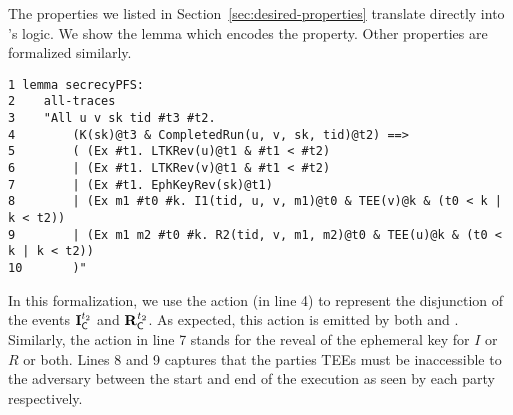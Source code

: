 %

The properties we listed in Section~\ref{sec:desired-properties}
translate directly into \mTamarin's logic.
%
We show the \mTamarin{} lemma which encodes the \mPredPfs{} property.
%
Other properties are formalized similarly.
%

\begin{small}
\begin{verbatim}
1 lemma secrecyPFS:
2    all-traces
3    "All u v sk tid #t3 #t2.
4        (K(sk)@t3 & CompletedRun(u, v, sk, tid)@t2) ==>
5        ( (Ex #t1. LTKRev(u)@t1 & #t1 < #t2)
6        | (Ex #t1. LTKRev(v)@t1 & #t1 < #t2)
7        | (Ex #t1. EphKeyRev(sk)@t1)
8        | (Ex m1 #t0 #k. I1(tid, u, v, m1)@t0 & TEE(v)@k & (t0 < k | k < t2))
9        | (Ex m1 m2 #t0 #k. R2(tid, v, m1, m2)@t0 & TEE(u)@k & (t0 < k | k < t2))
10       )"
\end{verbatim}
\end{small}
%

In this formalization, we use the action 
(in line 4) to represent the disjunction of the events $\mathbf{I}_{\textsf{C}}^{t_{2}}$
and $\mathbf{R}_{\textsf{C}}^{t_{2}}$.
%
As expected, this action is emitted by both  and .
%
Similarly, the action  in line 7 stands for the reveal of
the ephemeral key for $I$ or $R$ or both.
%
Lines 8 and 9 captures that the parties TEEs must be inaccessible to the
adversary between the start and end of the execution as seen by each party
respectively.
%
